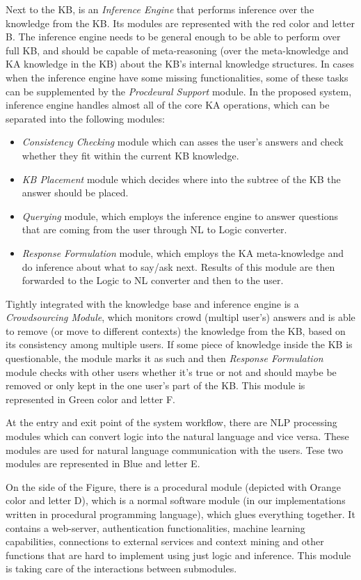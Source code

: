 Next to the KB, is an \emph{Inference Engine} that performs inference over 
the knowledge from the KB. Its modules are represented with the red color 
and letter B. The inference engine needs to be general enough to be able to
perform over full KB, and should be capable of meta-reasoning (over the 
meta-knowledge and KA knowledge in the KB) about the KB's internal knowledge
structures. In cases when the inference engine have some missing functionalities,
some of these tasks can be supplemented by the \emph{Procdeural Support} 
module. In the proposed system, inference engine handles almost all of the 
core KA operations, which can be separated into the following modules:
\begin{itemize}
   \item \emph{Consistency Checking} module which can asses the user's answers
   and check whether they fit within the current KB knowledge.
   \item \emph{KB Placement} module which decides where into the subtree of the
   KB the answer should be placed.
   \item \emph{Querying} module, which employs the inference engine to answer
   questions that are coming from the user through NL to Logic converter.
   \item \emph{Response Formulation} module, which employs the KA meta-knowledge
   and do inference about what to say/ask next. Results of this module are then
   forwarded to the Logic to NL converter and then to the user.
\end{itemize}

Tightly integrated with the knowledge base and inference engine is a 
\emph{Crowdsourcing Module}, which monitors crowd (multipl user's) answers and 
is able to remove (or move to different contexts) the knowledge from the KB, 
based on its consistency among multiple users. If some piece of knowledge inside
the KB is questionable, the module marks it as such and then \emph{Response
Formulation} module checks with other users whether it's true or not and should
maybe be removed or only kept in the one user's part of the KB. This module is 
represented in Green color and letter F.

At the entry and exit point of the system workflow, there are NLP processing  
modules which can convert logic into the natural language and vice versa. These
modules are used for natural language communication with the users. Tese two
modules are represented in Blue and letter E.

On the side of the Figure, there is a procedural module (depicted with Orange
color and letter D), which is a normal software module (in our implementations
written in procedural programming language), which glues everything together.
It contains a web-server, authentication functionalities, machine
learning capabilities, connections to external services and context mining
and other functions that are hard to implement using just logic and inference.
This module is taking care of the interactions between submodules. 

